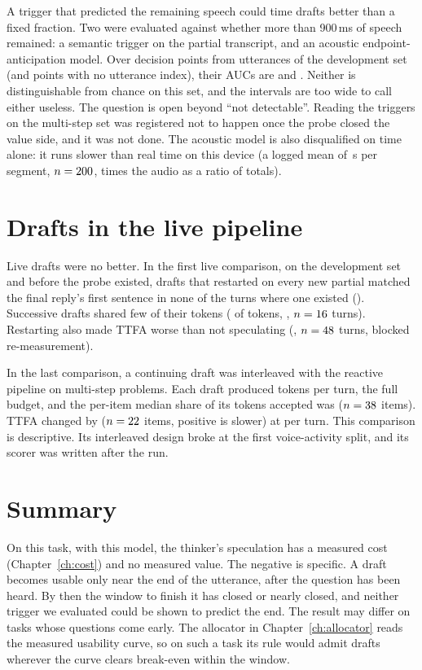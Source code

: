 A trigger that predicted the remaining speech could time drafts better than a
fixed fraction. Two were evaluated against whether more than 900\,ms of speech
remained: a semantic trigger on the partial transcript, and an acoustic
endpoint-anticipation model. Over \TriggerPoints{} decision points from
\TriggerUtts{} utterances of the development set (and \TriggerUnindexed{}
points with no utterance index), their AUCs are \TsemAUC{} and \EpaAUC. Neither
is distinguishable from chance on this set, and the intervals are too wide to
call either useless. The question is open beyond ``not detectable''. Reading
the triggers on the multi-step set was registered not to happen once the
probe closed the value side, and it was not done. The acoustic model is also
disqualified on time alone: it runs slower than real time on this device
(a logged mean of \EpaWall\,s per segment, $n=200$, \EpaRtf{} times the audio as a ratio of totals).

\section{Drafts in the live pipeline}
\label{sec:live-thinker}

Live drafts were no better. In the first live comparison, on the development
set and before the probe existed, drafts that restarted on every new partial
matched the final reply's first sentence in
none of the turns where one existed
(\PgFirst). Successive drafts shared few of their tokens
(\PgSurvival{} of tokens, \PgSurvivalCI, $n=16$ turns). Restarting also
made TTFA worse than not speculating
(\PgBlocked, $n=48$ turns, blocked re-measurement).

In the last comparison, a continuing draft was interleaved with the reactive
pipeline on multi-step problems. Each draft produced \SpecTokens{} tokens per
turn, the full budget, and the per-item median share of its tokens accepted
was \SpecAccepted{} ($n=38$ items). TTFA changed by \SpecTTFAr{}
($n=22$ items, positive is slower) at \SpecEnergyr{} per turn. This
comparison is descriptive. Its interleaved design broke at the first
voice-activity split, and its scorer was written after the run.

\section{Summary}

On this task, with this model, the thinker's speculation has a measured cost
(Chapter~\ref{ch:cost}) and no measured value. The negative is specific. A
draft becomes usable only near the end of the utterance, after the question
has been heard. By then the window to finish it has closed or nearly closed,
and neither trigger we evaluated could be shown to predict the end. The
result may differ on tasks whose questions come early. The allocator in
Chapter~\ref{ch:allocator} reads the measured usability curve, so on such a
task its rule would admit drafts wherever the curve clears break-even within
the window.
